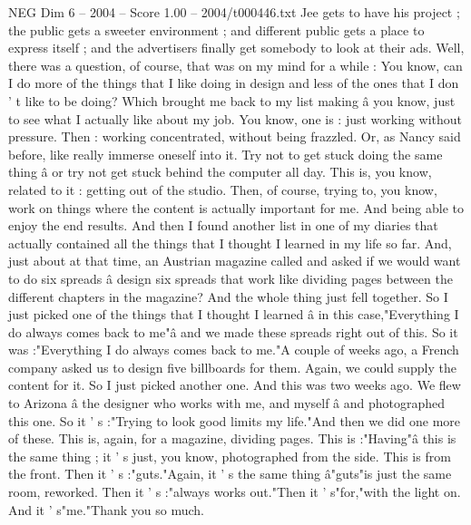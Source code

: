 \begin{textsample}{NEG Dim 6 – 2004 – Score 1.00 – 2004/t000446.txt}
Jee gets to have his project ; the public gets a sweeter environment ; and different public gets a place to express itself ; and the advertisers finally get somebody to look at their ads.
Well, there was a question, of course, that was on my mind for a while : You know, can I do more of the things that I like doing in design and less of the ones that I don ' t like to be doing?
Which brought me back to my list making â you know, just to see what I actually like about my job.
You know, one is : just working without pressure.
Then : working concentrated, without being frazzled.
Or, as Nancy said before, like really immerse oneself into it.
Try not to get stuck doing the same thing â or try not get stuck behind the computer all day.
This is, you know, related to it : getting out of the studio.
Then, of course, trying to, you know, work on things where the content is actually important for me.
And being able to enjoy the end results.
And then I found another list in one of my diaries that actually contained all the things that I thought I learned in my life so far.
And, just about at that time, an Austrian magazine called and asked if we would want to do six spreads â design six spreads that work like dividing pages between the different chapters in the magazine?
And the whole thing just fell together.
So I just picked one of the things that I thought I learned â in this case,"Everything I do always comes back to me"â and we made these spreads right out of this.
So it was :"Everything I do always comes back to me."A couple of weeks ago, a French company asked us to design five billboards for them.
Again, we could supply the content for it.
So I just picked another one.
And this was two weeks ago.
We flew to Arizona â the designer who works with me, and myself â and photographed this one.
So it ' s :"Trying to look good limits my life."And then we did one more of these.
This is, again, for a magazine, dividing pages.
This is :"Having"â this is the same thing ; it ' s just, you know, photographed from the side.
This is from the front.
Then it ' s :"guts."Again, it ' s the same thing â"guts"is just the same room, reworked.
Then it ' s :"always works out."Then it ' s"for,"with the light on.
And it ' s"me."Thank you so much.

\end{textsample}
